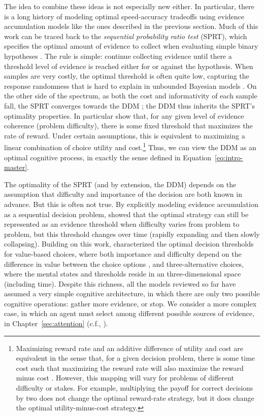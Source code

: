The idea to combine these ideas is not especially new either. In particular, there is a long history of modeling optimal speed-accuracy tradeoffs using evidence accumulation models like the ones described in the previous section. Much of this work can be traced back to the \emph{sequential probability ratio test} (SPRT), which specifies the optimal amount of evidence to collect when evaluating simple binary hypotheses \citet{wald1945sequential}. The rule is simple: continue collecting evidence until there a threshold level of evidence is reached either for or against the hypothesis. When samples are very costly, the optimal threshold is often quite low, capturing the response randomness that is hard to explain in unbounded Bayesian models \citep{vul2014one}. On the other side of the spectrum, as both the cost and informativity of each sample fall, the SPRT converges towards the DDM \citep{gold2002banburismus}; the DDM thus inherits the SPRT's optimality properties. In particular \citet{bogacz2006physics} show that, for any given level of evidence coherence (problem difficulty), there is some fixed threshold that maximizes the rate of reward. Under certain assumptions, this is equivalent to maximizing a linear combination of choice utility and cost.\footnote{
  Maximizing reward rate and an additive difference of utility and cost are equivalent in the sense that, for a given decision problem, there is some time cost such that maximizing the reward rate will also maximize the reward minus cost \citep{wald1948optimum,drugowitsch2012cost}. However, this mapping will vary for problems of different difficulty or stakes. For example, multiplying the payoff for correct decisions by two does not change the optimal reward-rate strategy, but it does change the optimal utility-minus-cost strategy.
} Thus, we can view the DDM as an optimal cognitive process, in exactly the sense defined in Equation~\ref{eq:intro-master}.

The optimality of the SPRT (and by extension, the DDM) depends on the assumption that difficulty and importance of the decision are both known in advance. But this is often not true. By explicitly modeling evidence accumulation as a sequential decision problem, \citet{drugowitsch2012cost} showed that the optimal strategy can still be represented as an evidence threshold when difficulty varies from problem to problem, but this threshold changes over time (rapidly expanding and then slowly collapsing). Building on this work, \citet{tajima2016optimal} characterized the optimal decision thresholds for value-based choices, where both importance and difficulty depend on the difference in value between the choice options \citep{tajima2016optimal}, and three-alternative choices, where the mental states and thresholds reside in an three-dimensional space (including time). Despite this richness, all the models reviewed so far have assumed a very simple cognitive architecture, in which there are only two possible cognitive operations: gather more evidence, or stop. We consider a more complex case, in which an agent must select among different possible sources of evidence, in Chapter~\ref{sec:attention} (c.f., \citealp{hebert2019rational,jang2021optimal}).

